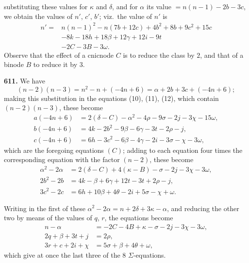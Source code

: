 \documentclass[11pt,a4paper]{article}
\newcommand{\artno}[1]{\textbf{#1.}\quad}
\begin{document}
substituting these values for $\kappa$ and $\delta$, and for $\alpha$ its
value $= n(n-1) - 2b - 3c$, we obtain the values of $n'$, $c'$, $b'$; viz.\
the value of $n'$ is
\begin{align*}
  n' = {} & n(n-1)^{2} - n(7b + 12c) + 4b^{2} + 8b + 9c^{2} + 15c \\
        & - 8k - 18h + 18\beta + 12\gamma + 12i - 9t \\
        & - 2C - 3B - 3\omega.
\end{align*}
Observe that the effect of a cnicnode $C$ is to reduce the class by $2$, and
that of a binode $B$ to reduce it by $3$.

\medskip

\artno{611} We have
\[
  (n-2)(n-3) = n^{2} - n + (-4n + 6) = \alpha + 2b + 3c + (-4n + 6);
\]
making this substitution in the equations (10), (11), (12), which contain
$(n-2)(n-3)$, these become
\begin{align*}
  a(-4n + 6) & = 2(\delta - C) - \alpha^{2} - 4\rho - 9\sigma - 2j - 3\chi - 15\omega, \\
  b(-4n + 6) & = 4k - 2b^{2} - 9\beta - 6\gamma - 3t - 2\rho - j, \\
  c(-4n + 6) & = 6h - 3c^{2} - 6\beta - 4\gamma - 2i - 3\sigma - \chi - 3\omega,
\end{align*}
which are the foregoing equations $(C)$; adding to each equation four times
the corresponding equation with the factor $(n-2)$, these become
\begin{align*}
  \alpha^{2} - 2\alpha & = 2(\delta - C) + 4(\kappa - B) - \sigma - 2j - 3\chi - 3\omega, \\
  2b^{2} - 2b & = 4k - \beta + 6\gamma + 12t - 3t + 2\rho - j, \\
  3c^{2} - 2c & = 6h + 10\beta + 4\theta - 2i + 5\sigma - \chi + \omega.
\end{align*}

Writing in the first of these $\alpha^{2} - 2\alpha = n + 2\delta + 3\kappa - \alpha$,
and reducing the other two by means of the values of $q$, $r$, the equations
become
\begin{align*}
  n - \alpha & = -2C - 4B + \kappa - \sigma - 2j - 3\chi - 3\omega, \\
  2q + \beta + 3t + j & = 2\rho, \\
  3r + c + 2i + \chi & = 5\sigma + \beta + 4\theta + \omega,
\end{align*}
which give at once the last three of the 8 $\Sigma$-equations.
\end{document}
